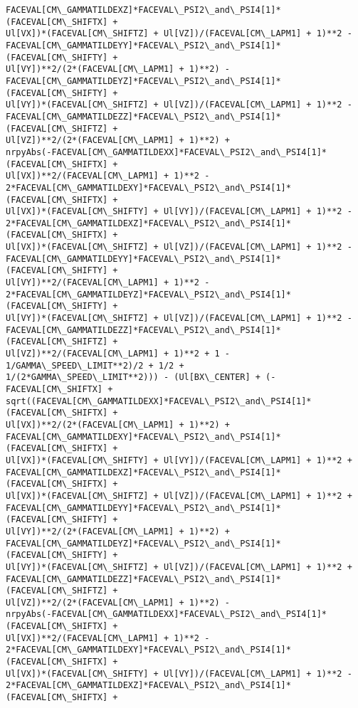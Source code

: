 \documentclass[landscape,letterpaper,10pt,english]{article}
\begin{document}
\begin{Verbatim}[commandchars=\\\{\}]
FACEVAL[CM\_GAMMATILDEXZ]*FACEVAL\_PSI2\_and\_PSI4[1]*(FACEVAL[CM\_SHIFTX] +
Ul[VX])*(FACEVAL[CM\_SHIFTZ] + Ul[VZ])/(FACEVAL[CM\_LAPM1] + 1)**2 -
FACEVAL[CM\_GAMMATILDEYY]*FACEVAL\_PSI2\_and\_PSI4[1]*(FACEVAL[CM\_SHIFTY] +
Ul[VY])**2/(2*(FACEVAL[CM\_LAPM1] + 1)**2) -
FACEVAL[CM\_GAMMATILDEYZ]*FACEVAL\_PSI2\_and\_PSI4[1]*(FACEVAL[CM\_SHIFTY] +
Ul[VY])*(FACEVAL[CM\_SHIFTZ] + Ul[VZ])/(FACEVAL[CM\_LAPM1] + 1)**2 -
FACEVAL[CM\_GAMMATILDEZZ]*FACEVAL\_PSI2\_and\_PSI4[1]*(FACEVAL[CM\_SHIFTZ] +
Ul[VZ])**2/(2*(FACEVAL[CM\_LAPM1] + 1)**2) +
nrpyAbs(-FACEVAL[CM\_GAMMATILDEXX]*FACEVAL\_PSI2\_and\_PSI4[1]*(FACEVAL[CM\_SHIFTX] +
Ul[VX])**2/(FACEVAL[CM\_LAPM1] + 1)**2 -
2*FACEVAL[CM\_GAMMATILDEXY]*FACEVAL\_PSI2\_and\_PSI4[1]*(FACEVAL[CM\_SHIFTX] +
Ul[VX])*(FACEVAL[CM\_SHIFTY] + Ul[VY])/(FACEVAL[CM\_LAPM1] + 1)**2 -
2*FACEVAL[CM\_GAMMATILDEXZ]*FACEVAL\_PSI2\_and\_PSI4[1]*(FACEVAL[CM\_SHIFTX] +
Ul[VX])*(FACEVAL[CM\_SHIFTZ] + Ul[VZ])/(FACEVAL[CM\_LAPM1] + 1)**2 -
FACEVAL[CM\_GAMMATILDEYY]*FACEVAL\_PSI2\_and\_PSI4[1]*(FACEVAL[CM\_SHIFTY] +
Ul[VY])**2/(FACEVAL[CM\_LAPM1] + 1)**2 -
2*FACEVAL[CM\_GAMMATILDEYZ]*FACEVAL\_PSI2\_and\_PSI4[1]*(FACEVAL[CM\_SHIFTY] +
Ul[VY])*(FACEVAL[CM\_SHIFTZ] + Ul[VZ])/(FACEVAL[CM\_LAPM1] + 1)**2 -
FACEVAL[CM\_GAMMATILDEZZ]*FACEVAL\_PSI2\_and\_PSI4[1]*(FACEVAL[CM\_SHIFTZ] +
Ul[VZ])**2/(FACEVAL[CM\_LAPM1] + 1)**2 + 1 - 1/GAMMA\_SPEED\_LIMIT**2)/2 + 1/2 +
1/(2*GAMMA\_SPEED\_LIMIT**2))) - (Ul[BX\_CENTER] + (-FACEVAL[CM\_SHIFTX] +
sqrt((FACEVAL[CM\_GAMMATILDEXX]*FACEVAL\_PSI2\_and\_PSI4[1]*(FACEVAL[CM\_SHIFTX] +
Ul[VX])**2/(2*(FACEVAL[CM\_LAPM1] + 1)**2) +
FACEVAL[CM\_GAMMATILDEXY]*FACEVAL\_PSI2\_and\_PSI4[1]*(FACEVAL[CM\_SHIFTX] +
Ul[VX])*(FACEVAL[CM\_SHIFTY] + Ul[VY])/(FACEVAL[CM\_LAPM1] + 1)**2 +
FACEVAL[CM\_GAMMATILDEXZ]*FACEVAL\_PSI2\_and\_PSI4[1]*(FACEVAL[CM\_SHIFTX] +
Ul[VX])*(FACEVAL[CM\_SHIFTZ] + Ul[VZ])/(FACEVAL[CM\_LAPM1] + 1)**2 +
FACEVAL[CM\_GAMMATILDEYY]*FACEVAL\_PSI2\_and\_PSI4[1]*(FACEVAL[CM\_SHIFTY] +
Ul[VY])**2/(2*(FACEVAL[CM\_LAPM1] + 1)**2) +
FACEVAL[CM\_GAMMATILDEYZ]*FACEVAL\_PSI2\_and\_PSI4[1]*(FACEVAL[CM\_SHIFTY] +
Ul[VY])*(FACEVAL[CM\_SHIFTZ] + Ul[VZ])/(FACEVAL[CM\_LAPM1] + 1)**2 +
FACEVAL[CM\_GAMMATILDEZZ]*FACEVAL\_PSI2\_and\_PSI4[1]*(FACEVAL[CM\_SHIFTZ] +
Ul[VZ])**2/(2*(FACEVAL[CM\_LAPM1] + 1)**2) -
nrpyAbs(-FACEVAL[CM\_GAMMATILDEXX]*FACEVAL\_PSI2\_and\_PSI4[1]*(FACEVAL[CM\_SHIFTX] +
Ul[VX])**2/(FACEVAL[CM\_LAPM1] + 1)**2 -
2*FACEVAL[CM\_GAMMATILDEXY]*FACEVAL\_PSI2\_and\_PSI4[1]*(FACEVAL[CM\_SHIFTX] +
Ul[VX])*(FACEVAL[CM\_SHIFTY] + Ul[VY])/(FACEVAL[CM\_LAPM1] + 1)**2 -
2*FACEVAL[CM\_GAMMATILDEXZ]*FACEVAL\_PSI2\_and\_PSI4[1]*(FACEVAL[CM\_SHIFTX] +

\end{Verbatim}
\end{document}

